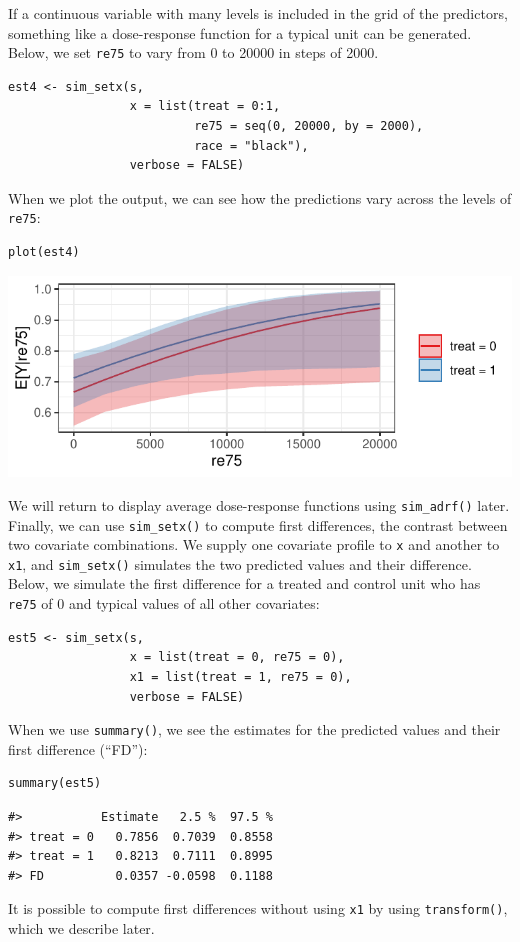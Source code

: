 If a continuous variable with many levels is included in the grid of the predictors, something like a dose-response function for a typical unit can be generated. Below, we set \texttt{re75} to vary from 0 to 20000 in steps of 2000.
\begin{verbatim}
est4 <- sim_setx(s,
                 x = list(treat = 0:1,
                          re75 = seq(0, 20000, by = 2000),
                          race = "black"),
                 verbose = FALSE)
\end{verbatim}
When we plot the output, we can see how the predictions vary across the levels of \texttt{re75}:
\begin{verbatim}
plot(est4)
\end{verbatim}
\begin{center}\includegraphics{figures/plot4-1} \end{center}
We will return to display average dose-response functions using \texttt{sim\_adrf()} later.
Finally, we can use \texttt{sim\_setx()} to compute first differences, the contrast between two covariate combinations. We supply one covariate profile to \texttt{x} and another to \texttt{x1}, and \texttt{sim\_setx()} simulates the two predicted values and their difference. Below, we simulate the first difference for a treated and control unit who has \texttt{re75} of 0 and typical values of all other covariates:
\begin{verbatim}
est5 <- sim_setx(s,
                 x = list(treat = 0, re75 = 0),
                 x1 = list(treat = 1, re75 = 0),
                 verbose = FALSE)
\end{verbatim}
When we use \texttt{summary()}, we see the estimates for the predicted values and their first difference (``FD''):
\begin{verbatim}
summary(est5)
\end{verbatim}
\begin{verbatim}
#>           Estimate   2.5 %  97.5 %
#> treat = 0   0.7856  0.7039  0.8558
#> treat = 1   0.8213  0.7111  0.8995
#> FD          0.0357 -0.0598  0.1188
\end{verbatim}
It is possible to compute first differences without using \texttt{x1} by using \texttt{transform()}, which we describe later.
